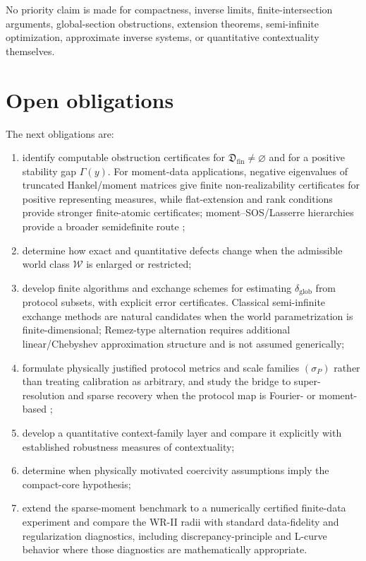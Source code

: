 \documentclass[11pt]{article}
\newcommand{\W}{\mathcal W}
\newcommand{\Dfin}{\mathfrak D_{\mathrm{fin}}}
\begin{document}
No priority claim is made for compactness, inverse limits, finite-intersection
arguments, global-section obstructions, extension theorems, semi-infinite
optimization, approximate inverse systems, or quantitative contextuality
themselves.

\section{Open obligations}

The next obligations are:
\begin{enumerate}
\item identify computable obstruction certificates for
$\Dfin\neq\varnothing$ and for a positive stability gap $\Gamma(y)$.
For moment-data applications, negative eigenvalues of truncated Hankel/moment
matrices give finite non-realizability certificates for positive representing
measures, while flat-extension and rank conditions provide stronger
finite-atomic certificates; moment--SOS/Lasserre hierarchies provide a broader
semidefinite route \cite{CurtoFialkow1998,Lasserre2001};
\item determine how exact and quantitative defects change when the admissible
world class $\W$ is enlarged or restricted;
\item develop finite algorithms and exchange schemes for estimating
$\delta_{\mathrm{glob}}$ from protocol subsets, with explicit error
certificates. Classical semi-infinite exchange methods are natural candidates
when the world parametrization is finite-dimensional; Remez-type alternation
requires additional linear/Chebyshev approximation structure and is not
assumed generically;
\item formulate physically justified protocol metrics and scale families
$(\sigma_P)$ rather than treating calibration as arbitrary, and study the
bridge to super-resolution and sparse recovery when the protocol map is
Fourier- or moment-based \cite{CandesFernandezGranda2014};
\item develop a quantitative context-family layer and compare it explicitly
with established robustness measures of contextuality;
\item determine when physically motivated coercivity assumptions imply the
compact-core hypothesis;
\item extend the sparse-moment benchmark to a numerically certified finite-data
experiment and compare the WR-II radii with standard data-fidelity and
regularization diagnostics, including discrepancy-principle and L-curve
behavior where those diagnostics are mathematically appropriate.
\end{enumerate}
\end{document}
